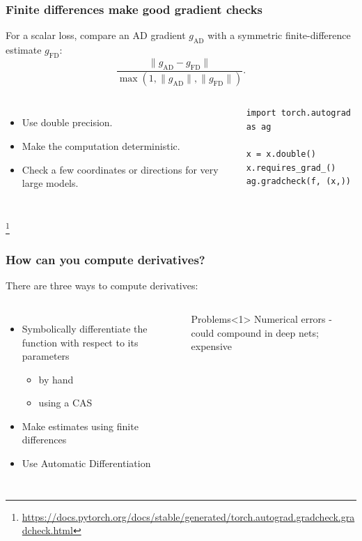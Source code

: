 \documentclass[]{article}
\newcommand\blfootnote[1]{%
  \begingroup
  \renewcommand\thefootnote{}\footnote{#1}%
  \addtocounter{footnote}{-1}%
  \endgroup
}
\begin{document}
\begin{frame}[fragile]
	\frametitle{Finite differences make good gradient checks}

	For a scalar loss, compare an AD gradient $g_{\mathrm{AD}}$ with a symmetric finite-difference estimate $g_{\mathrm{FD}}$:
	\begin{equation*}
		\frac{\lVert g_{\mathrm{AD}}-g_{\mathrm{FD}}\rVert}
		{\max\!\left(1,\lVert g_{\mathrm{AD}}\rVert,\lVert g_{\mathrm{FD}}\rVert\right)}.
	\end{equation*}

	\begin{columns}
		\begin{itemize}
			\item Use double precision.
			\item Make the computation deterministic.
			\item Check a few coordinates or directions for very large models.
		\end{itemize}

		\begin{lstlisting}[basicstyle=\tiny\ttfamily]
import torch.autograd as ag

x = x.double()
x.requires_grad_()
ag.gradcheck(f, (x,))
		\end{lstlisting}
	\end{columns}
	\blfootnote{\url{https://docs.pytorch.org/docs/stable/generated/torch.autograd.gradcheck.gradcheck.html}}
\end{frame}

\begin{frame}
	\frametitle{How can you compute derivatives?}
There are three ways to compute derivatives:

\begin{columns}
	\column{.45\textwidth}
    \begin{itemize}
    	\item<0> Symbolically differentiate the function with respect to its parameters
    	\begin{itemize}
    		\item by hand
    		\item using a CAS
    	\end{itemize}
    	\item<1> Make estimates using finite differences
    	\item<2> Use Automatic Differentiation
    \end{itemize}

      \begin{block}{Problems}<1>
        Numerical errors - could compound in deep nets; expensive
      \end{block}
  \end{columns}
\end{frame}
\end{document}
